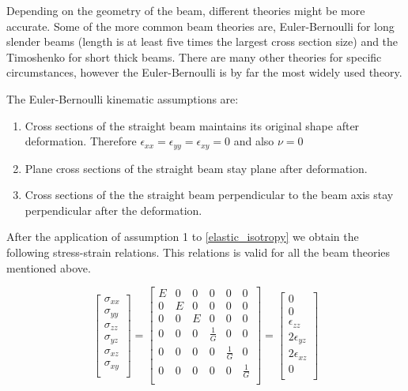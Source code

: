  Depending on the geometry of the beam, different theories might be more accurate. Some of the more common beam theories are, Euler-Bernoulli for long slender beams (length is at least five times the largest cross section size) and the Timoshenko for short thick beams. There are many other theories for specific circumstances, however the Euler-Bernoulli is by far the most widely used theory.

 The Euler-Bernoulli kinematic assumptions are:
 \begin{enumerate}
 \item Cross sections of the straight beam maintains its original shape after deformation. Therefore $\epsilon_{xx}=\epsilon_{yy}=\epsilon_{xy}=0$ and also $\nu=0$  
 \item Plane cross sections of the straight beam stay plane after deformation.
 \item Cross sections of the the straight beam perpendicular to the beam axis stay perpendicular after the deformation.  
 \end{enumerate}

 After the application of assumption 1 to \ref{elastic_isotropy} we obtain the following stress-strain relations. This relations is valid for all the beam theories mentioned above.

 \begin{equation}
 \begin{bmatrix}
 \sigma_{xx}\\
 \sigma_{yy}\\
 \sigma_{zz}\\
 \sigma_{yz}\\
 \sigma_{xz}\\
 \sigma_{xy}\\
 \end{bmatrix}=
 \begin{bmatrix}
 E & 0 & 0 & 0& 0&0\\[1mm]
 0 & E & 0 & 0& 0&0\\[1mm]
 0 & 0 & E & 0& 0&0\\[1mm]
 0 & 0 & 0 & \frac{1}{G}  & 0 &0 \\[1mm]
 0 & 0 & 0 & 0  & \frac{1}{G} &0 \\[1mm]
 0 & 0 & 0 & 0  & 0 &\frac{1}{G} \\[1mm]
 \end{bmatrix}=
 \begin{bmatrix}
 0\\
 0\\
 \epsilon_{zz}\\
 2\epsilon_{yz}\\
 2\epsilon_{xz}\\
 0\\
 \end{bmatrix}
 \end{equation}

